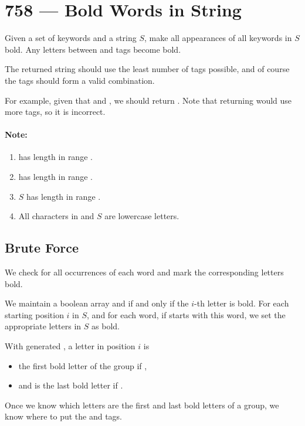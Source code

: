 \section{758 --- Bold Words in String}

Given a set of keywords  and a string $S$, make all appearances of all keywords in $S$ bold. Any letters between  and  tags become bold.

The returned string should use the least number of tags possible, and of course the tags should form a valid combination.

For example, given that  and , we should return . Note that returning  would use more tags, so it is incorrect.

\paragraph{Note:}

\begin{enumerate}
\item {} has length in range \fcj{[0, 50]}.
\item {} has length in range \fcj{[1, 10]}.
\item $S$ has length in range \fcj{[0, 500]}.
\item All characters in  and $S$ are lowercase letters.
\end{enumerate}

\subsection{Brute Force}
We check for all occurrences of each word and mark the corresponding letters bold.

We maintain a boolean array  and  if and only if the $i$-th letter is bold. For each starting position $i$ in $S$, and for each word, if  starts with this word, we set the appropriate letters in $S$ as bold.

With generated , a letter in position $i$ is 

\begin{itemize}
\item the first bold letter of the group if , 
\item and is the last bold letter if . 

\end{itemize}
Once we know which letters are the first and last bold letters of a group, we know where to put the  and  tags.

